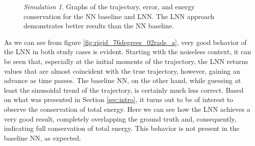 \documentclass[a4paper]{article}
\begin{document}
\begin{figure}
    \centering
    \qquad
    \caption{\textit{Simulation 1}. Graphs of the trajectory, error, and energy conservation for the NN baseline and LNN. The LNN approach demonstrates better results than the NN baseline.}
    \label{fig:rigid_76degrees_02rads}
\end{figure}

As we can see from figure \ref{fig:rigid_76degrees_02rads_a}, very good behavior of the LNN in both study cases is evident. Starting with the noiseless context, it can be seen that, especially at the initial moments of the trajectory, the LNN returns values that are almost coincident with the true trajectory, however, gaining an advance as time passes. The baseline NN, on the other hand, while guessing at least the sinusoidal trend of the trajectory, is certainly much less correct. Based on what was presented in Section \ref{sec:intro}, it turns out to be of interest to observe the conservation of total energy. Here we can see how the LNN achieves a very good result, completely overlapping the ground truth and, consequently, indicating full conservation of total energy.  This behavior is not present in the baseline NN, as expected. 
\end{document}
